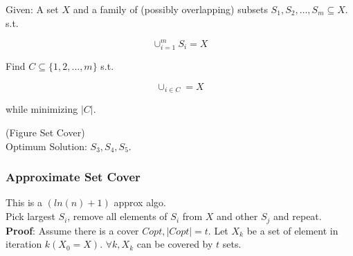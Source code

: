 \documentclass{article}
\begin{document}
Given: A set $X$ and a family of (possibly overlapping) subsets $S_1, S_2,
\dots, S_m \subseteq X$. s.t.

$$
    \cup_{i = 1}^{m} S_{i} = X
$$

Find $C \subseteq \{1, 2, \dots, m\}$ s.t.

$$
    \cup_{i \in C} = X
$$

while minimizing $|C|$.

(Figure Set Cover)\\

Optimum Solution: $S_{3}, S_{4}, S_{5}$.\\

\subsubsection{Approximate Set Cover}

This is a $(ln(n) + 1)$ approx algo.\\

Pick largest $S_{i}$, remove all elements of $S_{i}$ from $X$ and other $S_{j}$
and repeat.\\

\textbf{Proof}: Assume there is a cover $Copt, |Copt| = t$. Let $X_{k}$ be a set 
of element in iteration $k (X_{0} = X)$. $\forall k, X_{k}$ can be covered by
$t$ sets.
\end{document}
